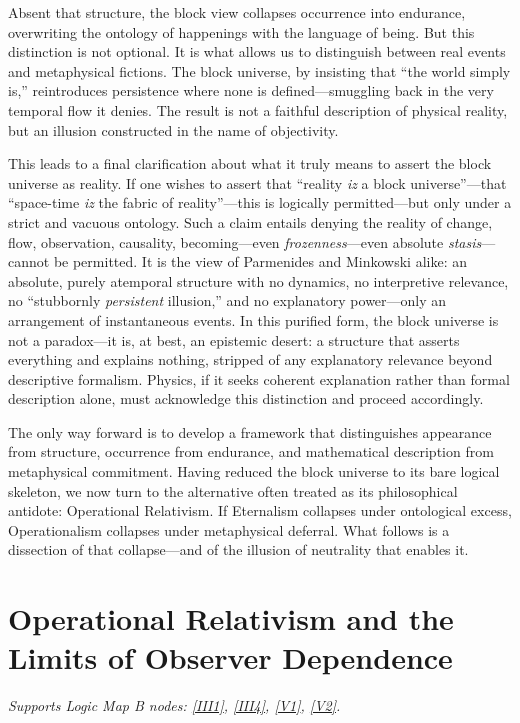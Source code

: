 \documentclass[12pt]{book}
\begin{document}
Absent that structure, the block view collapses occurrence into endurance, overwriting the ontology of happenings with the language of being. But this distinction is not optional. It is what allows us to distinguish between real events and metaphysical fictions. The block universe, by insisting that ``the world simply is,'' reintroduces persistence where none is defined---smuggling back in the very temporal flow it denies. The result is not a faithful description of physical reality, but an illusion constructed in the name of objectivity.

This leads to a final clarification about what it truly means to assert the block universe as reality. If one wishes to assert that ``reality \textit{iz} a block universe''---that ``space-time \textit{iz} the fabric of reality''---this is logically permitted---but only under a strict and vacuous ontology. Such a claim entails denying the reality of change, flow, observation, causality, becoming---even \textit{frozenness}---even absolute \textit{stasis}---cannot be permitted. It is the view of Parmenides and Minkowski alike: an absolute, purely atemporal structure with no dynamics, no interpretive relevance, no ``stubbornly \textit{persistent} illusion,'' and no explanatory power---only an arrangement of instantaneous events. In this purified form, the block universe is not a paradox---it is, at best, an epistemic desert: a structure that asserts everything and explains nothing, stripped of any explanatory relevance beyond descriptive formalism. Physics, if it seeks coherent explanation rather than formal description alone, must acknowledge this distinction and proceed accordingly.

The only way forward is to develop a framework that distinguishes appearance from structure, occurrence from endurance, and mathematical description from metaphysical commitment. Having reduced the block universe to its bare logical skeleton, we now turn to the alternative often treated as its philosophical antidote: Operational Relativism. If Eternalism collapses under ontological excess, Operationalism collapses under metaphysical deferral. What follows is a dissection of that collapse---and of the illusion of neutrality that enables it.

\chapter[Operational Relativism]{Operational Relativism and the Limits of Observer Dependence}\label{sec:4}
\noindent\textit{Supports Logic Map B nodes: \hyperref[appendix:III1]{[III1]}, \hyperref[appendix:III4]{[III4]}, \hyperref[appendix:V1]{[V1]}, \hyperref[appendix:V2]{[V2]}.}
\end{document}
